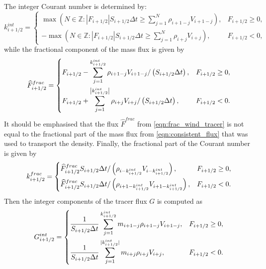 \documentclass{ametsocV6.1}
\begin{document}
The integer Courant number is determined by:
\begin{equation} \label{eqn:int_courant_tracer}
k^{int}_{i+1/2} = 
\begin{cases}
\max\left(N\in\mathbb{Z} : |F_{i+1/2}|S_{i+1/2} \Delta t \geq\sum_{j=1}^N \rho_{i+1-j} V_{i+1-j} \right), & F_{i+1/2} \geq 0, \\
-\max\left(N\in\mathbb{Z} : |F_{i+1/2}|S_{i+1/2} \Delta t \geq\sum_{j=1}^N \rho_{i+j} V_{i+j} \right), & F_{i+1/2} < 0,
\end{cases}
\end{equation}
while the fractional component of the mass flux is given by
\begin{equation} \label{eqn:frac_wind_tracer}
\widehat{F}^{frac}_{i+1/2} = 
\begin{dcases}
F_{i+1/2}-\sum_{j=1}^{k^{int}_{i+1/2}} \rho_{i+1-j} V_{i+1-j} / \left(S_{i+1/2}\Delta t\right), & F_{i+1/2} \geq 0, \\
F_{i+1/2}+\sum_{j=1}^{\left|k^{int}_{i+1/2}\right|} \rho_{i+j} V_{i+j} / \left(S_{i+1/2}\Delta t\right), & F_{i+1/2} < 0.
\end{dcases}
\end{equation}
It should be emphasised that the flux $\widehat{F}^{frac}$ from \eqref{eqn:frac_wind_tracer} is not equal to the fractional part of the mass flux from \eqref{eqn:consistent_flux} that was used to transport the density.
Finally, the fractional part of the Courant number is given by
\begin{equation} \label{eqn:frac_courant_tracer}
k^{frac}_{i+1/2} =
\begin{dcases}
\widehat{F}^{frac}_{i+1/2} S_{i+1/2}\Delta t / \left(\rho_{i-k^{int}_{i+1/2}} V_{i-k^{int}_{i+1/2}}\right), & F_{i+1/2} \geq 0, \\
\widehat{F}^{frac}_{i+1/2} S_{i+1/2}\Delta t / \left(\rho_{i+1-k^{int}_{i+1/2}} V_{i+1-k^{int}_{i+1/2}} \right), & F_{i+1/2} < 0.
\end{dcases}
\end{equation}
Then the integer components of the tracer flux $G$ is computed as
\begin{equation}
    G^{int}_{i+1/2} = 
    \begin{dcases}
        \frac{1}{S_{i+1/2}\Delta{t}}\sum_{j=1}^{k_{i+1/2}^{int}} m_{i+1-j} \rho_{i+1-j} V_{i+1-j}, & F_{i+1/2} \geq 0, \\
        \frac{1}{S_{i+1/2}\Delta{t}}\sum_{j=1}^{|k_{i+1/2}^{int}|} m_{i+j} \rho_{i+j} V_{i+j}, & F_{i+1/2} < 0.
    \end{dcases}
\end{equation}
\end{document}
